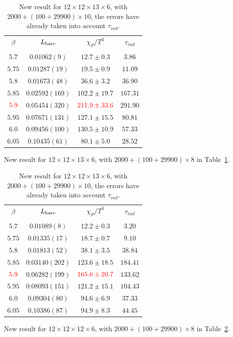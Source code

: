 \begin{table}
\begin{center}
\begin{tabular}{c|c|c|c}
    \hline    
$\beta$ & $L_{\rm bare}$ & $\chi _P/T^3$ & $\tau _{ind}$\\
& & & \\
\hline
$5.7$  & $0.01062(9)$ & $12.7\pm 0.3$ & $3.86$ \\
\hline
$5.75$ & $0.01287(19)$ & $19.5\pm 0.9$ & $11.09$ \\
\hline
$5.8$  & $0.01673(48)$ & $36.6\pm 3.2$ & $36.90$ \\
\hline
$5.85$ & $0.02592(169)$ & $102.2\pm 19.7$ & $167.31$ \\
\hline
$\textcolor[rgb]{1,0,0}{5.9}$ & $0.05454(320)$ & $\textcolor[rgb]{1,0,0}{211.9\pm 33.6}$ & $291.90$ \\
\hline
$5.95$ & $0.07671(131)$ & $127.1\pm 15.5$ & $80.81$ \\
\hline
$6.0$  & $0.09456(100)$ & $130.5\pm 10.9$ & $57.33$ \\
\hline
$6.05$ & $0.10435(61)$ & $80.1\pm 5.0$ & $28.52$ \\
\hline
\end{tabular}
\caption{\label{tab.res.quenchphasetransition3}New result for $12\times 12 \times 13 \times 6$, with $2000+(100+29900)\times 10$, the errors have already taken into account $\tau _{ind}$.}
\end{center}
\end{table}
New result for $12\times 12 \times 13 \times 6$, with $2000+(100+29900)\times 8$ in Table~\ref{tab.res.quenchphasetransition3}.

\begin{table}
\begin{center}
\begin{tabular}{c|c|c|c}
\hline    
$\beta$ & $L_{\rm bare}$ & $\chi _P/T^3$ & $\tau _{ind}$\\
& & & \\
\hline
$5.7$  & $0.01089(8)$ & $12.2\pm 0.3$ & $3.20$ \\
\hline
$5.75$ & $0.01335(17)$ & $18.7\pm 0.7$ & $9.10$ \\
\hline
$5.8$  & $0.01813(52)$ & $38.1\pm 3.5$ & $38.84$ \\
\hline
$5.85$ & $0.03140(202)$ & $123.6\pm 18.5$ & $184.41$ \\
\hline
$\textcolor[rgb]{1,0,0}{5.9}$ & $0.06282(199)$ & $\textcolor[rgb]{1,0,0}{165.6\pm 20.7}$ & $133.62$ \\
\hline
$5.95$ & $0.08093(151)$ & $121.2\pm 15.1$ & $104.43$ \\
\hline
$6.0$  & $0.09304(80)$ & $94.6\pm 6.9$ & $37.33$ \\
\hline
$6.05$ & $0.10386(87)$ & $94.9\pm 8.3$ & $44.45$ \\
\hline
\end{tabular}
\caption{\label{tab.res.quenchphasetransition4}New result for $12\times 12 \times 13 \times 6$, with $2000+(100+29900)\times 10$, the errors have already taken into account $\tau _{ind}$.}
\end{center}
\end{table}
New result for $12\times 12 \times 12 \times 6$, with $2000+(100+29900)\times 8$ in Table~\ref{tab.res.quenchphasetransition4}.

